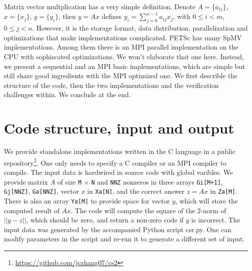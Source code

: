 \documentclass[submission]{eptcs}
\begin{document}
Matrix vector multplication has a very simple definition.
Denote $A = \{a_{ij}\}$, $x = \{x_j\}$, $y = \{y_i\}$, then $y = Ax$ defines
$y_i = \sum_{j=0}^{n-1}a_{ij} x_j$, with $0\leq i < m$, $0 \leq j < n$.
However, it is the storage format, data distribution, parallelization and optimizations
that make implementations complicated.
PETSc has many SpMV implementations.
Among them there is an MPI parallel implementation on the CPU with sophiscated optimizations.
We won't elaborate that one here.
Instead, we present a sequential and an MPI basic implementations, which are simple but still share good
ingredients with the MPI optimized one.
We first describle the structure of the code, then the two implementations and the verification challenges within. We conclude at the end.

\section{Code structure, input and output}
We provide standalone implementations written in the C language in a
public repository\footnote{\url{https://github.com/jczhang07/cs2}}.
One only needs to specify a C compiler or an MPI compiler to compile.
The input data is hardwired in source code with global varibles.
We provide matrix $A$ of size {\tt M} $\times$ {\tt N} and {\tt NNZ} nonzeros in three arrays
{\tt Gi[M+1]}, {\tt Gj[NNZ]}, {\tt Ga[NNZ]},
vector $x$ in {\tt Xa[N]}, and the correct answer $z = Ax$ in {\tt Za[M]}. There is also an array {\tt Ya[M]}
to provide space for vector $y$, which will store the computed result of $Ax$. The code will compute the square of
the 2-norm of $|| y - z ||$, which should be zero, and return a non-zero code if $y$ is incorrect.
The input data was generated by the accompanied Python script csr.py. One can modify parameters in the script and re-run
it to generate a different set of input.
\end{document}
